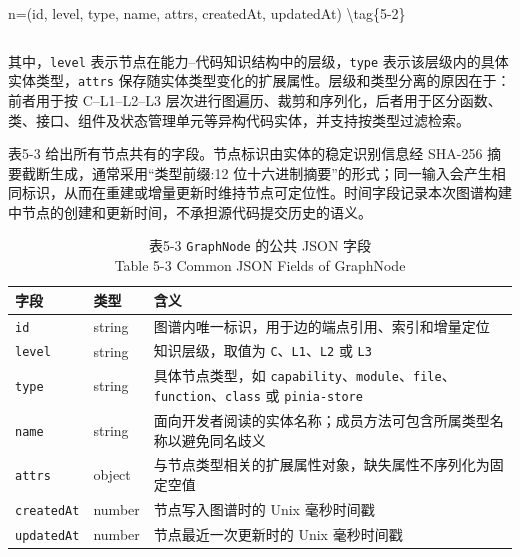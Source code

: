 \begin{equation}

\end{equation}

n=(id, level, type, name, attrs, createdAt, updatedAt) \textbackslash{}tag\{5-2\}

\begin{equation}

\end{equation}

其中，\texttt{level} 表示节点在能力--代码知识结构中的层级，\texttt{type} 表示该层级内的具体实体类型，\texttt{attrs} 保存随实体类型变化的扩展属性。层级和类型分离的原因在于：前者用于按 C--L1--L2--L3 层次进行图遍历、裁剪和序列化，后者用于区分函数、类、接口、组件及状态管理单元等异构代码实体，并支持按类型过滤检索。

表5-3 给出所有节点共有的字段。节点标识由实体的稳定识别信息经 SHA-256 摘要截断生成，通常采用“类型前缀:12 位十六进制摘要”的形式；同一输入会产生相同标识，从而在重建或增量更新时维持节点可定位性。时间字段记录本次图谱构建中节点的创建和更新时间，不承担源代码提交历史的语义。

\begin{table}[htbp]
\centering
\small
\caption{表5-3 \texttt{GraphNode} 的公共 JSON 字段\\Table 5-3 Common JSON Fields of GraphNode}
\begin{tabularx}{\textwidth}{|X|X|X|}
\hline
\textbf{字段} & \textbf{类型} & \textbf{含义} \\
\hline
\texttt{id} & string & 图谱内唯一标识，用于边的端点引用、索引和增量定位 \\
\texttt{level} & string & 知识层级，取值为 \texttt{C}、\texttt{L1}、\texttt{L2} 或 \texttt{L3} \\
\texttt{type} & string & 具体节点类型，如 \texttt{capability}、\texttt{module}、\texttt{file}、\texttt{function}、\texttt{class} 或 \texttt{pinia-store} \\
\texttt{name} & string & 面向开发者阅读的实体名称；成员方法可包含所属类型名称以避免同名歧义 \\
\texttt{attrs} & object & 与节点类型相关的扩展属性对象，缺失属性不序列化为固定空值 \\
\texttt{createdAt} & number & 节点写入图谱时的 Unix 毫秒时间戳 \\
\texttt{updatedAt} & number & 节点最近一次更新时的 Unix 毫秒时间戳 \\
\hline
\end{tabularx}
\end{table}

